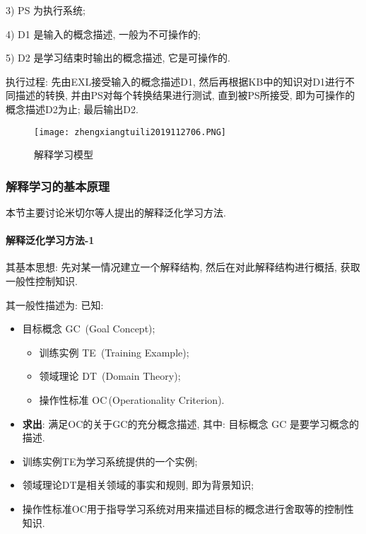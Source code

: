 3) PS 为执行系统;

4) D1 是输入的概念描述, 一般为不可操作的;

5) D2 是学习结束时输出的概念描述, 它是可操作的.

执行过程: 先由EXL接受输入的概念描述D1, 然后再根据KB中的知识对D1进行不同描述的转换, 并由PS对每个转换结果进行测试, 直到被PS所接受, 即为可操作的概念描述D2为止; 最后输出D2.

\begin{figure}[H]
\centering
\texttt{[image: zhengxiangtuili2019112706.PNG]}
\caption{解释学习模型}
\label{AI32fig2706}
\end{figure}
\subsubsection{解释学习的基本原理}
本节主要讨论米切尔等人提出的解释泛化学习方法.
\paragraph{解释泛化学习方法-1}
其基本思想: 先对某一情况建立一个解释结构, 然后在对此解释结构进行概括, 获取一般性控制知识.

其一般性描述为: 已知:
\begin{itemize}
\item 目标概念 GC\, (Goal Concept);
      \begin{itemize}
          \item 训练实例 TE\, (Training Example);
          \item 领域理论 DT\, (Domain Theory);
           \item 操作性标准  OC\,(Operationality Criterion).
       \end{itemize}
\item \textbf{求出}: 满足OC的关于GC的充分概念描述, 其中: 目标概念 GC 是要学习概念的描述.
\end{itemize}

\begin{itemize}
    \item 训练实例TE为学习系统提供的一个实例;
    \item 领域理论DT是相关领域的事实和规则, 即为背景知识;
    \item 操作性标准OC用于指导学习系统对用来描述目标的概念进行舍取等的控制性知识.
\end{itemize}
